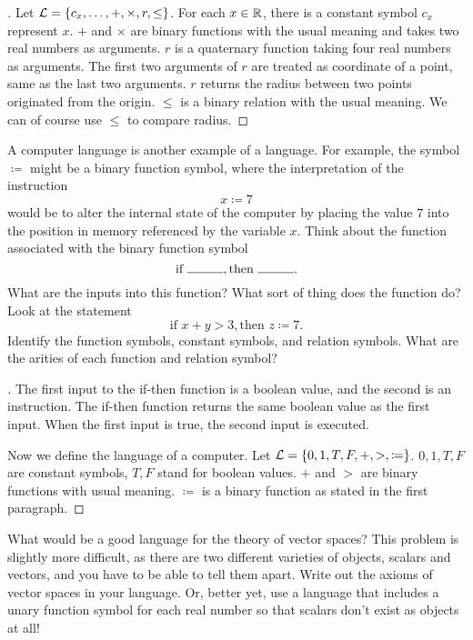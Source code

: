\begin{proof}[]
  Let \(\mathcal{L} = \left\lbrace c_x, \dots, +, \times, r, \leq\right\rbrace\).
  For each \(x \in \mathbb{R}\), there is a constant symbol \(c_x\) represent \(x\).
  \(+\) and \(\times\) are binary functions with the usual meaning and takes two real numbers as arguments.
  \(r\) is a quaternary function taking four real numbers as arguments.
  The first two arguments of \(r\) are treated as coordinate of a point, same as the last two arguments.
  \(r\) returns the radius between two points originated from the origin.
  \(\leq\) is a binary relation with the usual meaning.
  We can of course use \(\leq\) to compare radius.
\end{proof}

\begin{ex}\label{ex:1.2.6}
  A computer language is another example of a language.
  For example, the symbol \(\coloneqq\) might be a binary function symbol, where the interpretation of the instruction
  \[
    x \coloneqq 7
  \]
  would be to alter the internal state of the computer by placing the value \(7\) into the position in memory referenced by the variable \(x\).
  Think about the function associated with the binary function symbol
  \[
    \text{if } \rule{1cm}{0.15mm}, \text{then } \rule{1cm}{0.15mm}.
  \]
  What are the inputs into this function?
  What sort of thing does the function do?
  Look at the statement
  \[
    \text{if } x + y > 3, \text{then } z \coloneqq 7.
  \]
  Identify the function symbols, constant symbols, and relation symbols.
  What are the arities of each function and relation symbol?
\end{ex}

\begin{proof}[]
  The first input to the if-then function is a boolean value, and the second is an instruction.
  The if-then function returns the same boolean value as the first input.
  When the first input is true, the second input is executed.

  Now we define the language of a computer.
  Let \(\mathcal{L} = \left\lbrace0, 1, T, F, +, >, \coloneqq\right\rbrace\).
  \(0, 1, T, F\) are constant symbols, \(T, F\) stand for boolean values.
  \(+\) and \(>\) are binary functions with usual meaning.
  \(\coloneqq\) is a binary function as stated in the first paragraph.
\end{proof}

\begin{ex}\label{ex:1.2.7}
  What would be a good language for the theory of vector spaces?
  This problem is slightly more difficult, as there are two different varieties of objects, scalars and vectors, and you have to be able to tell them apart.
  Write out the axioms of vector spaces in your language.
  Or, better yet, use a language that includes a unary function symbol for each real number so that scalars don't exist as objects at all!
\end{ex}

